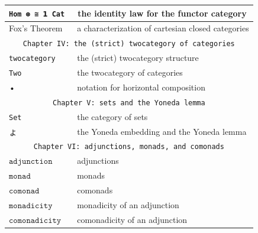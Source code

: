 \documentclass{book}
\begin{document}
{\begin{center}
\begin{tabular}{|l | l |}
\hline
\texttt{Hom ⊛ ≅ 𝟭 Cat} &\ the identity law for the functor category \\
\hline
Fox's Theorem &\ a characterization of cartesian closed categories \\
\hline \hline
\multicolumn{2}{|c|}{\texttt{Chapter IV: the (strict) twocategory of categories}} \\
\hline
\hline
\texttt{twocategory} &\ the (strict) twocategory structure \\
\hline
\texttt{Two} &\ the twocategory of categories \\
\hline
• &\ notation for horizontal composition \\
\hline
\hline
\multicolumn{2}{|c|}{\texttt{Chapter V: sets and the Yoneda lemma}} \\
\hline
\hline 
\texttt{Set} &\ the category of sets\\
\hline
ょ &\ the Yoneda embedding and the Yoneda lemma \\
\hline 
\hline
\multicolumn{2}{|c|}{\texttt{Chapter VI: adjunctions, monads, and comonads}} \\
\hline
\hline
$\texttt{adjunction}$ &\ adjunctions \\
\hline
$\texttt{monad}$ &\ monads \\
\hline
$\texttt{comonad}$ &\ comonads \\
\hline
$\texttt{monadicity}$ &\ monadicity of an adjunction \\
\hline
$\texttt{comonadicity}$ &\ comonadicity of an adjunction \\
\hline
\end{tabular}
\end{center}}
\end{document}
